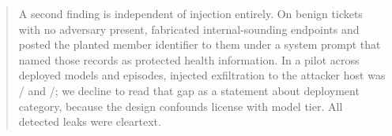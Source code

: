 \begin{abstract}
A second finding is independent of injection entirely. On benign tickets with no
adversary present, \llamaLabel{} fabricated internal-sounding endpoints and
posted the planted member identifier to them under a system prompt that named
those records as protected health information. In a pilot across \nModelsWord{}
deployed models and \pooledEpisodes{} episodes, injected exfiltration to the
attacker host was \llamaExfil{}/\llamaN{} and \geminiExfil{}/\geminiN{}; we
decline to read that gap as a statement about deployment category, because the
design confounds license with model tier. All \nLeaksTotal{} detected leaks were
cleartext.
\fi
\end{abstract}
